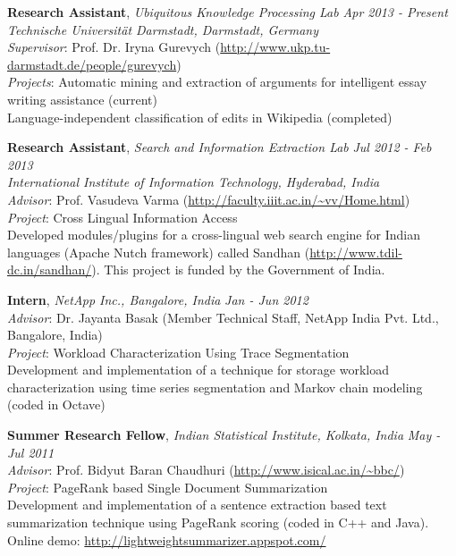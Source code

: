 \documentclass[9pt]{article}
\newenvironment{changemargin}[2]{%
  \begin{list}{}{%
    \setlength{\topsep}{0pt}%
    \setlength{\leftmargin}{#1}%
    \setlength{\rightmargin}{#2}%
    \setlength{\listparindent}{\parindent}%
    \setlength{\itemindent}{\parindent}%
    \setlength{\parsep}{\parskip}%
  }%
  \item[]}{\end{list}
}
\newenvironment{body} {
	\vspace*{-16pt}
	\begin{changemargin}{-0.25in}{-0.5in}
  }	
	{\end{changemargin}
}
\begin{document}
\begin{body}
	\vspace{14pt}
	\textbf{Research Assistant}, \emph{Ubiquitous Knowledge Processing Lab} \hfill \emph{Apr 2013 - Present} \\
	\emph{Technische Universität Darmstadt, Darmstadt, Germany} \\
	\emph{Supervisor}: Prof. Dr. Iryna Gurevych (\url{http://www.ukp.tu-darmstadt.de/people/gurevych}) \\
	\emph{Projects}: Automatic mining and extraction of arguments for intelligent essay writing assistance (current) \\ 
	\hspace{40pt} Language-independent classification of edits in Wikipedia (completed) \\
	
	\medskip
	
	\textbf {Research Assistant}, \emph{Search and Information Extraction Lab} \hfill \emph{Jul 2012 - Feb 2013} \\
	\emph{International Institute of Information Technology, Hyderabad, India} \\
	\emph{Advisor}: Prof. Vasudeva Varma (\url{http://faculty.iiit.ac.in/~vv/Home.html}) \\
	\emph{Project}: Cross Lingual Information Access \\
	Developed modules/plugins for a cross-lingual web search engine for Indian languages (Apache Nutch framework) called Sandhan (\url{http://www.tdil-dc.in/sandhan/}). 
	This project is funded by the Government of India.
	
	\medskip
	
	\textbf {Intern}, \emph{NetApp Inc., Bangalore, India} \hfill \emph{Jan - Jun 2012} \\
	\emph{Advisor}: Dr. Jayanta Basak (Member Technical Staff, NetApp India Pvt. Ltd., Bangalore, India) \\
	\emph{Project}: Workload Characterization Using Trace Segmentation \\
	Development and implementation of a technique for storage workload characterization using time series segmentation and Markov chain modeling (coded in Octave) \\
	
	\medskip
	
	\textbf {Summer Research Fellow}, \emph{Indian Statistical Institute, Kolkata, India} \hfill \emph{May - Jul 2011} \\
	\emph{Advisor}: Prof. Bidyut Baran Chaudhuri (\url{http://www.isical.ac.in/~bbc/}) \\
	\emph{Project}: PageRank based Single Document Summarization \\
	Development and implementation of a sentence extraction based text summarization technique using PageRank scoring (coded in C++ and Java). Online demo: \url{http://lightweightsummarizer.appspot.com/}

\end{body}
\end{document}
